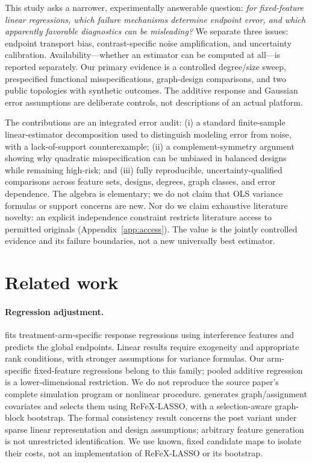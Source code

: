 \documentclass{article}
\begin{document}
This study asks a narrower, experimentally answerable question: \emph{for fixed-feature linear regressions, which failure mechanisms determine endpoint error, and which apparently favorable diagnostics can be misleading?} We separate three issues: endpoint transport bias, contrast-specific noise amplification, and uncertainty calibration. Availability---whether an estimator can be computed at all---is reported separately. Our primary evidence is a controlled degree/size sweep, prespecified functional misspecifications, graph-design comparisons, and two public topologies with synthetic outcomes. The additive response and Gaussian error assumptions are deliberate controls, not descriptions of an actual platform.

The contributions are an integrated error audit: (i) a standard finite-sample linear-estimator decomposition used to distinguish modeling error from noise, with a lack-of-support counterexample; (ii) a complement-symmetry argument showing why quadratic misspecification can be unbiased in balanced designs while remaining high-risk; and (iii) fully reproducible, uncertainty-qualified comparisons across feature sets, designs, degrees, graph classes, and error dependence. The algebra is elementary; we do not claim that OLS variance formulas or support concerns are new. Nor do we claim exhaustive literature novelty: an explicit independence constraint restricts literature access to permitted originals (Appendix~\ref{app:access}). The value is the jointly controlled evidence and its failure boundaries, not a new universally best estimator.

\section{Related work}
\paragraph{Regression adjustment.}
\citet{chin} fits treatment-arm-specific response regressions using interference features and predicts the global endpoints. Linear results require exogeneity and appropriate rank conditions, with stronger assumptions for variance formulas. Our arm-specific fixed-feature regressions belong to this family; pooled additive regression is a lower-dimensional restriction. We do not reproduce the source paper's complete simulation program or nonlinear procedure. \citet{han} generates graph/assignment covariates and selects them using ReFeX-LASSO, with a selection-aware graph-block bootstrap. The formal consistency result concerns the post variant under sparse linear representation and design assumptions; arbitrary feature generation is not unrestricted identification. We use known, fixed candidate maps to isolate their costs, not an implementation of ReFeX-LASSO or its bootstrap.
\end{document}
